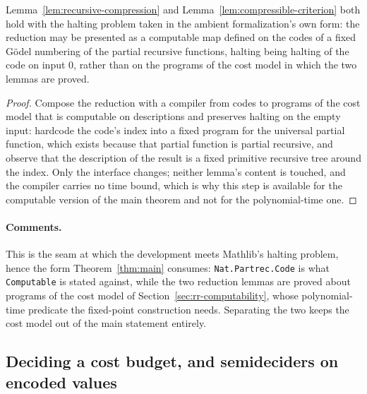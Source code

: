 \effortEasy

\begin{lemma}
\label{lem:halting-form}
\leanok
Lemma~\ref{lem:recursive-compression} and Lemma~\ref{lem:compressible-criterion} both
hold with the halting problem taken in the ambient formalization's own form: the reduction
may be presented as a computable map defined on the codes of a fixed G\"odel numbering of
the partial recursive functions, halting being halting of the code on input $0$, rather
than on the programs of the cost model in which the two lemmas are proved.
\end{lemma}

\begin{proof}
\leanok
{}
Compose the reduction with a compiler from codes to programs of the cost model that is
computable on descriptions and preserves halting on the empty input: hardcode the code's
index into a fixed program for the universal partial function, which exists because that
partial function is partial recursive, and observe that the description of the result is a
fixed primitive recursive tree around the index. Only the interface changes; neither
lemma's content is touched, and the compiler carries no time bound, which is why this step
is available for the computable version of the main theorem and not for the
polynomial-time one.
\end{proof}

\paragraph{Comments.} This is the seam at which the development meets Mathlib's halting
problem, hence the form Theorem~\ref{thm:main} consumes: \texttt{Nat.Partrec.Code} is
what \texttt{Computable} is stated against, while the two reduction lemmas are proved
about programs of the cost model of Section~\ref{sec:rr-computability}, whose
polynomial-time predicate the fixed-point construction needs. Separating the two keeps the
cost model out of the main statement entirely.

\subsection{Deciding a cost budget, and semideciders on encoded values}
\label{sec:rr-cost-budget}

